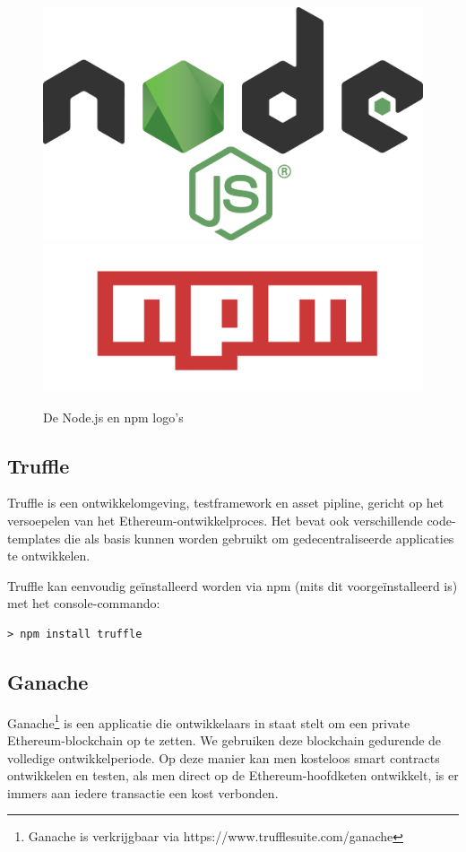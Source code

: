 	\begin{figure}
		\includegraphics[width=\linewidth/2]{img/nodejs.png}
		\includegraphics[width=\linewidth/2]{img/npm.png}
		\caption{De Node.js en npm logo's}
		\label{fig:nodejs}
	\end{figure}
	
	\subsection{Truffle}
	Truffle is een ontwikkelomgeving, testframework en asset pipline, gericht op het versoepelen van het Ethereum-ontwikkelproces. Het bevat ook verschillende code-templates die als basis kunnen worden gebruikt om gedecentraliseerde applicaties te ontwikkelen.
	
	Truffle kan eenvoudig geïnstalleerd worden via npm (mits dit voorgeïnstalleerd is) met het console-commando:
	 \lstset{language=bash}
	\begin{lstlisting}[numbers=none]
	> npm install truffle
	\end{lstlisting}
	\subsection{Ganache}
	Ganache\footnote{Ganache is verkrijgbaar via https://www.trufflesuite.com/ganache} is een applicatie die ontwikkelaars in staat stelt om een private Ethereum-blockchain op te zetten. We gebruiken deze blockchain gedurende de volledige ontwikkelperiode. Op deze manier kan men kosteloos smart contracts ontwikkelen en testen, als men direct op de Ethereum-hoofdketen ontwikkelt, is er immers aan iedere transactie een kost verbonden. 
	
